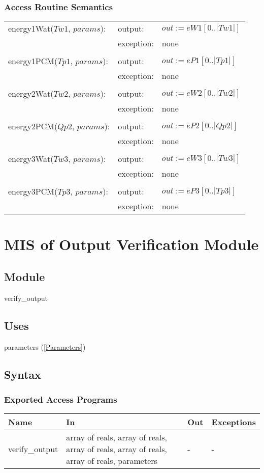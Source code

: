 \documentclass[12pt]{article}
\begin{document}
\subsubsection{Access Routine Semantics}
\begin{center}
\begin{tabular}{l l p{10cm}}
energy1Wat($Tw1$, $params$): & output: & $out := eW1[0..|Tw1|]$ \\ 
& exception: & none \\ \\
energy1PCM($Tp1$, $params$): & output: & $out := eP1[0..|Tp1|]$ \\ 
& exception: & none \\ \\
energy2Wat($Tw2$, $params$): & output: & $out := eW2[0..|Tw2|]$ \\ 
& exception: & none \\ \\
energy2PCM($Qp2$, $params$): & output: & $out := eP2[0..|Qp2|]$ \\ 
& exception: & none \\ \\
energy3Wat($Tw3$, $params$): & output: & $out := eW3[0..|Tw3|]$ \\ 
& exception: & none \\ \\
energy3PCM($Tp3$, $params$): & output: & $out := eP3[0..|Tp3|]$ \\
& exception: & none \\
\end{tabular}
\end{center}

\section{MIS of Output Verification Module} \label{VerifyOutput}
\subsection{Module}
verify\_output
\subsection{Uses}
parameters (\ref{Parameters})
\subsection{Syntax}
\subsubsection{Exported Access Programs}
\begin{center}
\begin{tabular}{p{3cm} p{7cm} p{2cm} p{2cm}}
\hline
\textbf{Name} & \textbf{In} & \textbf{Out} & \textbf{Exceptions} \\
\hline
verify\_output & array of reals, array of reals, array of reals, array of reals, array of reals, parameters & - & - \\
\hline
\end{tabular}
\end{center}
\end{document}
